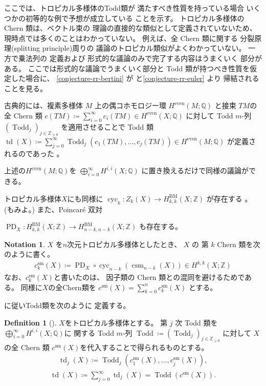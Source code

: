 \documentclass[a4paper,dvipdfmx,reqno,12pt]{amsart}
\theoremstyle{definition}
\newtheorem{definition}[theorem]{Definition}
\newtheorem{notation}[theorem]{Notation}
\newcommand{\deq}{\coloneqq}
\newcommand{\opn}[1]{\operatorname{#1}}
\numberwithin{equation}{section}
\begin{document}
ここでは、トロピカル多様体のTodd類が
満たすべき性質を持っている場合
いくつかの初等的な例で予想が成立している
ことを示す。
トロピカル多様体の Chern 類は、ベクトル束の
理論の直接的な類似として定義されていないため、
現時点では多くのことはわかっていない。
例えば、全 Chern 類に関する
分裂原理(splitting principle)周りの
議論のトロピカル類似がよくわかっていない。
一方で乗法列\cite[]{MR1335917}の
定義および
形式的な議論のみで完了する内容はうまくいく
部分がある。
ここでは形式的な議論でうまくいく部分と
Todd 類が持つべき性質を仮定した場合に、
\cref{conjecture-rr-bertini} 
が\cite[Conjecture 6.13]{demedrano2023chern}
と\cref{conjecture-rr-euler} より
帰結されることを見る。

古典的には、複素多様体 $M$ 上の偶コホモロジー環
$H^{\mathrm{even}}(M;\mathbb{Q})$
と接束 $TM$の全 Chern 類 
$c(TM)\deq \sum_{i=0}^{\infty}c_i(TM)\in 
H^{\mathrm{even}}(X;\mathbb{Q})$
に対して
Todd $m$-列 $(\opn{Todd}_j)_{j\in \mathbb{Z}_{\geq 0}}$
を適用させることで Todd 類
$\opn{td}(X)\deq \sum_{j=0}^{\infty}
\opn{Todd}_j(c_1(TM),\ldots,c_j(TM))\in 
H^{\mathrm{even}}(M;\mathbb{Q})$
が定義されるのであった
\cite[]{MR1335917}。

上述の$H^{\mathrm{even}}(M;\mathbb{Q})$を
$\bigoplus_{i=0}^{\infty} H^{i,i}(X;\mathbb{Q})$
に置き換えるだけで同様の議論ができる。

トロピカル多様体$X$にも同様に
$\opn{cyc}_k\colon Z_k(X)\to H^{\mathrm{BM}}_{k,k}(X;\mathbb{Z})$
が存在する
\cite{gross2019sheaftheoretic}。
(\cite[Definition 4.13]{MR3894860}もみよ。)
また、Poincar\'e 双対

$\opn{PD}_X\colon H_{k,k}^{\opn{BM}}(X;\mathbb{Z})
\to H_{n-k,n-k}^{\opn{BM}}(X;\mathbb{Z})$
も存在する。

\begin{notation}
$X$ を$n$次元トロピカル多様体としたとき、
$X$ の 第 $k$ Chern 類を次のように書く。 
\begin{align}
c_{k}^{\mathrm{sm}}(X)\deq
\opn{PD}_X\circ \opn{cyc}_{n-k}(\opn{csm}_{n-k}(X))
\in H^{k,k}(X;\mathbb{Z})
\end{align}
なお、$c_{k}^{\mathrm{sm}}(X)$と書いたのは、
因子類の Chern 類との混同を避けるためである。
同様に$X$の全Chern類を
$c^{\mathrm{sm}}(X)=\sum_{k=0}^{n} c_{k}^{\mathrm{sm}}(X)$
とする。
\end{notation}
\cite{demedrano2023chern}に従いTodd類を次のように
定義する。
\begin{definition}[{\cite{demedrano2023chern}}]
$X$をトロピカル多様体とする。
第 $j$ 次 Todd 類を
$\bigoplus_{i=0}^{\infty} H^{i,i}(X;\mathbb{Q})$に
関する Todd $m$-列 $\opn{Todd}\deq (\opn{Todd}_j)_{j\in \mathbb{Z}_{\geq 0}}$
に対して
$X$ の全 Chern 類
$c^{\mathrm{sm}}(X)$を代入することで得られるものとする。
\begin{align}
\opn{td}_j(X)\deq \opn{Todd}_j(c_{1}^{\mathrm{sm}}(X),
\ldots,c_{j}^{\mathrm{sm}}(X)),
\end{align}
\begin{align}
\opn{td}(X)\deq \sum_{j=0}^{\infty}\opn{td}_j(X)=
\opn{Todd}(c^{\mathrm{sm}}(X)).
\end{align}

\end{definition}
\end{document}

